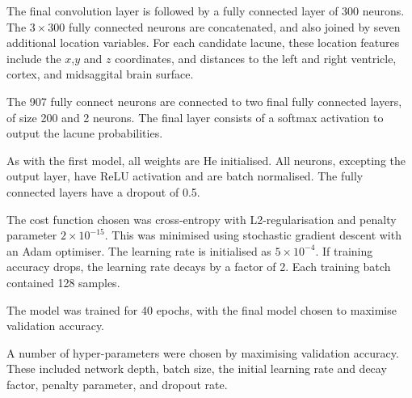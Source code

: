 The final convolution layer is followed by a fully connected layer of 300 neurons. The $3\times300$ fully connected neurons are concatenated, and also joined by seven additional location variables. For each candidate lacune, these location features include the $x$,$y$ and $z$ coordinates, and distances to the left and right ventricle, cortex, and midsaggital brain surface.

The 907 fully connect neurons are connected to two final fully connected layers, of size 200 and 2 neurons. The final layer consists of a softmax activation to output the lacune probabilities.

As with the first model, all weights are He initialised. All neurons, excepting the output layer, have ReLU activation and are batch normalised. The fully connected layers have a dropout of 0.5. 

The cost function chosen was cross-entropy with L2-regularisation and penalty parameter $2\times10^{-15}$. This was minimised using stochastic gradient descent with an Adam optimiser. The learning rate is initialised as $5\times10^{-4}$. If training accuracy drops, the learning rate decays by a factor of 2. Each training batch contained 128 samples.

The model was trained for 40 epochs, with the final model chosen to maximise validation accuracy.

A number of hyper-parameters were chosen by maximising validation accuracy. These included network depth, batch size, the initial learning rate and decay factor, penalty parameter, and dropout rate.




